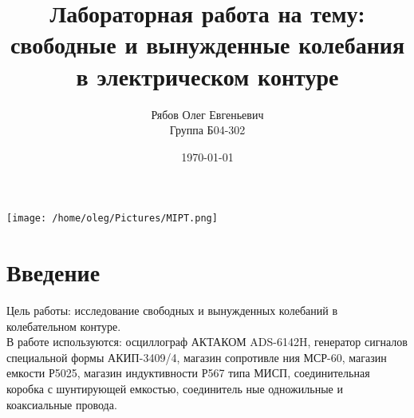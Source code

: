 \documentclass[a4paper, 12pt]{article}
\begin{document}
\begin{titlepage}
    \title{Лабораторная работа на тему: \\    
    свободные и вынужденные
    колебания в электрическом контуре}
    \author{ Рябов Олег Евгеньевич \\
    Группа Б04-302}
    \date{\today}
    \maketitle
    \vfill
    \begin{center}
        \texttt{[image: /home/oleg/Pictures/MIPT.png]}
    \end{center}
\end{titlepage}

\setcounter{page}{2}
\tableofcontents
\newpage

\section{Введение}
Цель работы: исследование свободных и вынужденных колебаний в
колебательном контуре.
\\

В работе используются: осциллограф АКТАКОМ ADS-6142H, генератор сигналов специальной формы АКИП-3409/4, магазин сопротивле
ния МСР-60, магазин емкости Р5025, магазин индуктивности Р567 типа
МИСП, соединительная коробка с шунтирующей емкостью, соединитель
ные одножильные и коаксиальные провода.
\end{document}
